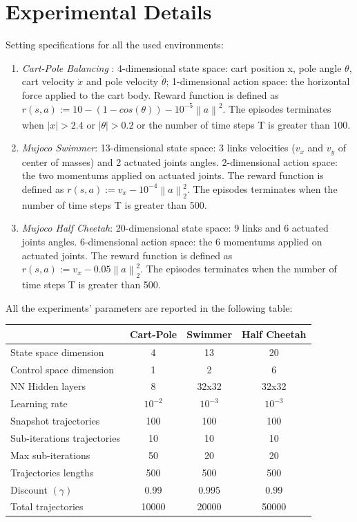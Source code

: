 \documentclass{article}
\theoremstyle{remark}
\theoremstyle{definition}
\newcommand{\norm}[2][\infty]{\left\|#2\right\|_{#1}}
\begin{document}
\section{Experimental Details}\label{app:exp}
Setting specifications for all the used environments:
\begin{enumerate}
	\item \emph{Cart-Pole Balancing} : 4-dimensional state space: cart position x, pole angle $\theta$, cart velocity $\dot{x}$ and pole velocity $\dot{\theta}$; 1-dimensional action space: the horizontal force applied to the cart body. Reward function  is defined as $r(s, a) := 10 - (1 - cos(\theta)) - 10^{-5}\norm[] a^2$. The episodes terminates when $|x|>2.4$ or $|\theta|>0.2$ or the number of time steps T is greater than 100.
	\item \emph{Mujoco Swimmer}: 13-dimensional state space: 3 links velocities ($v_x$ and $v_y$ of center of masses) and 2 actuated joints angles. 2-dimensional action space: the two momentums applied on actuated joints.  The reward function is defined as $r(s, a) := v_x - 10^{-4}\norm[2] a^2$. The episodes terminates when the number of time steps T is greater than 500.
	\item \emph{Mujoco Half Cheetah}: 20-dimensional state space: 9 links and 6 actuated joints angles. 6-dimensional action space: the 6 momentums applied on actuated joints.  The reward function is defined as $r(s, a) := v_x - 0.05\norm[2] a^2$. The episodes terminates when the number of time steps T is greater than 500.
\end{enumerate}

All the experiments' parameters are reported in the following table:

\centering
\begin{tabular}{| l | c  c  c |}
	\hline	
	& Cart-Pole & Swimmer & Half Cheetah \\
	\hline
	State space dimension  & 4 & 13 & 20 \\
	Control space dimension & 1 & 2 & 6 \\
	NN Hidden layers & 8 & 32x32 & 32x32 \\
	Learning rate & $10^{-2}$ & $10^{-3}$ & $10^{-3}$ \\
	Snapshot trajectories & 100 & 100 & 100 \\
	Sub-iterations trajectories & 10 & 10 & 10 \\
	Max sub-iterations & 50 & 20 & 20 \\
	Trajectories lengths& 500 & 500 & 500 \\
	Discount $(\gamma)$& 0.99 & 0.995 & 0.99 \\
	Total trajectories& 10000 & 20000 & 50000 \\
	\hline  
\end{tabular}
\end{document}
